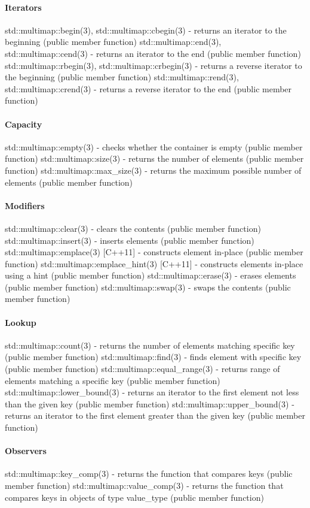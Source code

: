 \paragraph{Iterators}
std::multimap::begin(3), std::multimap::cbegin(3) - returns an iterator to the beginning   (public member function)
std::multimap::end(3), std::multimap::cend(3) - returns an iterator to the end   (public member function)
std::multimap::rbegin(3), std::multimap::crbegin(3) - returns a reverse iterator to the beginning   (public member function)
std::multimap::rend(3), std::multimap::crend(3) - returns a reverse iterator to the end   (public member function)
\paragraph{Capacity}
std::multimap::empty(3) - checks whether the container is empty   (public member function)
std::multimap::size(3) - returns the number of elements   (public member function)
std::multimap::max\_size(3) - returns the maximum possible number of elements   (public member function)
\paragraph{Modifiers}
std::multimap::clear(3) - clears the contents   (public member function)
std::multimap::insert(3) - inserts elements   (public member function)
std::multimap::emplace(3) [C++11] - constructs element in-place   (public member function)
std::multimap::emplace\_hint(3) [C++11] - constructs elements in-place using a hint   (public member function)
std::multimap::erase(3) - erases elements   (public member function)
std::multimap::swap(3) - swaps the contents   (public member function)
\paragraph{Lookup}
std::multimap::count(3) - returns the number of elements matching specific key   (public member function)
std::multimap::find(3) - finds element with specific key  (public member function)
std::multimap::equal\_range(3) - returns range of elements matching a specific key  (public member function)
std::multimap::lower\_bound(3) - returns an iterator to the first element not less than the given key  (public member function)
std::multimap::upper\_bound(3) - returns an iterator to the first element greater than the given key  (public member function)
\paragraph{Observers}
std::multimap::key\_comp(3) - returns the function that compares keys  (public member function)
std::multimap::value\_comp(3) - returns the function that compares keys in objects of type value\_type  (public member function)

